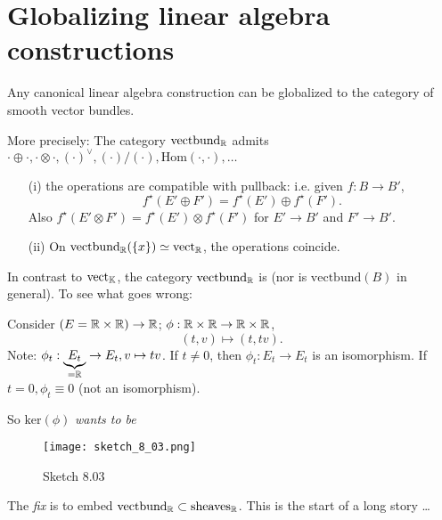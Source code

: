 \section{Globalizing linear algebra constructions}

\begin{theorem}\label{thm:8.4}
    Any  canonical linear algebra construction can be globalized 
    to the category of smooth vector bundles. 

    More precisely: The category \(\text{vectbund}_{\mathbb{R}}\) admits 
    \(\cdot \oplus \cdot,\cdot \otimes \cdot,(\cdot)^\vee,(\cdot)/(\cdot), \text{Hom}(\cdot,\cdot),\dots\)

    \begin{enumerate}
        \item[(i)] the operations are compatible with pullback: i.e. given \(f:B\to B'\),
        \[f^\star(E'\oplus F')=f^\star(E')\oplus f^\star(F').\]
        Also \(f^\star(E'\otimes F')=f^\star(E')\otimes f^\star(F')\) for \(E'\to B'\) and \(F'\to B'\).  
        \item[(ii)] On \(\text{vectbund}_{\mathbb{R}}(\{x\})\simeq \text{vect}_{\mathbb{R}}\), the operations coincide. 
    \end{enumerate}
\end{theorem}

\begin{remark}[Warning]
    In contrast to \(\text{vect}_{\mathbb{K}}\), the category \(\text{vectbund}_{\mathbb{R}}\) is  (nor is 
    \(\text{vectbund}(B)\) in general). To see  what goes wrong:

    Consider \((E=\mathbb{R}\times \mathbb{R})\to \mathbb{R}\); \(\phi:\mathbb{R}\times \mathbb{R} \to \mathbb{R}\times \mathbb{R}\), 
    \[(t,v)\mapsto (t,tv).\]
    Note: \(\phi_t:\underbrace{E_t}_{=\mathbb{R}}\to E_t, v\mapsto tv\). If \(t\neq 0\), then \(\phi_t:E_t\to E_t\)
    is an isomorphism. If \(t=0,\phi_t\equiv 0\) (not an isomorphism).
    
    So \(\text{ker}(\phi)\) \textit{wants to be}
    \begin{figure}[H]\label{fig:8.03}
        \centering
        \texttt{[image: sketch\_8\_03.png]}
        \caption{Sketch 8.03}
    \end{figure}
    The \textit{fix} is to embed \(\text{vectbund}_{\mathbb{R}}\subset\text{sheaves}_{\mathbb{R}}\). 
    This is the start of a long story \dots 
\end{remark}

